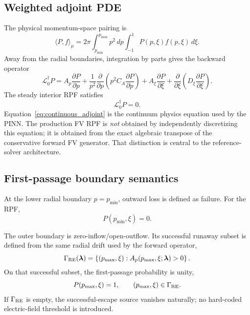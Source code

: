 \documentclass[11pt]{article}
\newcommand{\lam}{\bm\lambda}
\begin{document}
\subsection{Weighted adjoint PDE}

The physical momentum-space pairing is
\begin{equation}
 \langle P,f\rangle_\mu
 =2\pi\int_{p_{\min}}^{p_{\max}}p^2\,dp
      \int_{-1}^{1}P(p,\xi)f(p,\xi)\,d\xi.
 \label{eq:pairing}
\end{equation}
Away from the radial boundaries, integration by parts gives the backward operator
\begin{equation}
 \boxed{
 \mathcal L_0^\dagger P
 =A_p\frac{\partial P}{\partial p}
 +\frac{1}{p^2}\frac{\partial}{\partial p}
  \left(p^2C_A\frac{\partial P}{\partial p}\right)
 +A_\xi\frac{\partial P}{\partial\xi}
 +\frac{\partial}{\partial\xi}
  \left(D_\xi\frac{\partial P}{\partial\xi}\right).
 }
 \label{eq:continuous_adjoint}
\end{equation}
The steady interior RPF satisfies
\begin{equation}
 \mathcal L_0^\dagger P=0.
 \label{eq:continuous_steady}
\end{equation}
Equation~\eqref{eq:continuous_adjoint} is the continuum physics equation used by the PINN.
The production FV RPF is \emph{not} obtained by independently discretizing this equation;
it is obtained from the exact algebraic transpose of the conservative forward FV generator.
That distinction is central to the reference-solver architecture.

\subsection{First-passage boundary semantics}
\label{sec:boundary_semantics}

At the lower radial boundary $p=p_{\min}$, outward loss is defined as failure.  For the RPF,
\begin{equation}
 P(p_{\min},\xi)=0.
 \label{eq:lower_rpf_bc}
\end{equation}

The outer boundary is zero-inflow/open-outflow.  Its successful runaway subset is defined
from the same radial drift used by the forward operator,
\begin{equation}
 \Gamma_{\rm RE}(\lam)
 =\left\{(p_{\max},\xi):A_p(p_{\max},\xi;\lam)>0\right\}.
 \label{eq:success_set}
\end{equation}
On that successful subset, the first-passage probability is unity,
\begin{equation}
 P(p_{\max},\xi)=1,\qquad (p_{\max},\xi)\in\Gamma_{\rm RE}.
 \label{eq:upper_rpf_bc}
\end{equation}
If $\Gamma_{\rm RE}$ is empty, the successful-escape source vanishes naturally; no
hard-coded electric-field threshold is introduced.
\end{document}
